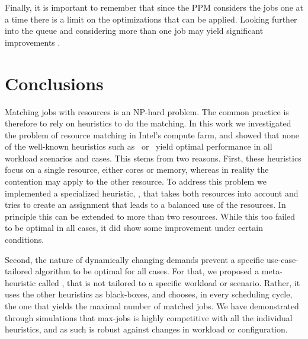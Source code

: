 Finally, it is important to remember that since the PPM considers 
the jobs one at a time
there is a limit on the optimizations that can be applied. 
Looking further into the queue and considering more than one job 
may yield significant improvements \cite{Shmueli05backfillingwith}.


\chapter{Conclusions}
\label{sec:conclusions}

Matching jobs with resources is an NP-hard problem.
The common practice is therefore to rely on heuristics to do the
matching.
In this work we investigated the problem of resource matching in
Intel's compute farm, and showed that none of the well-known
heuristics such as \bef\ or \wof\ yield optimal performance in
all workload scenarios and cases.
This stems from two reasons.
First, these heuristics focus on a single resource, either cores or
memory, whereas in reality the contention may apply to the other
resource.
To address this problem we implemented a specialized heuristic, \mif,
that takes both resources into account and tries to create an
assignment that leads to a balanced use of the resources.
In principle this can be extended to more than two resources.
While this too failed to be optimal in all cases, it did show some
improvement under certain conditions.

Second, the nature of dynamically changing demands prevent a specific
use-case-tailored algorithm to be optimal for all cases.
For that, we proposed a meta-heuristic called \maj, that is not
tailored to a specific workload or scenario.
Rather, it uses the other heuristics as black-boxes, and chooses, in
every scheduling cycle, the one that yields the maximal number of
matched jobs.
We have demonstrated through simulations that max-jobs is highly
competitive with all the individual heuristics, and as such is robust
against changes in workload or configuration.



